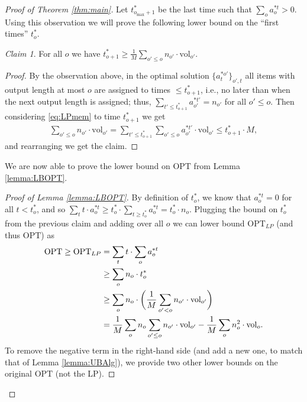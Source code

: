 \documentclass[11pt, a4paper]{article}
\theoremstyle{plain}
\theoremstyle{definition}
\theoremstyle{remark}
\newcommand{\OPT}{\text{OPT}}
\newtheorem{claim}[theorem]{Claim}
\newcommand{\vol}{\textrm{vol}}
\begin{document}
\begin{proof}[Proof of Theorem \ref{thm:main}]
Let $t^*_{o_{\max} + 1}$ be the last time such that $\sum_o a^{* t}_o > 0$. Using this observation we will prove the following lower bound on the ``first times'' $t^*_o$.



\begin{claim}	\label{claim:tStar}
	For all $o$ we have $t^*_{o + 1} \ge \frac{1}{M} \sum_{o' \le o} n_{o'} \cdot \vol_{o'}$. 
\end{claim}

\begin{proof}
	By the observation above, in the optimal solution $\{a^{*o'}_t\}_{o',t}$ all items with output length at most $o$ are assigned to times $\le t^*_{o + 1}$, i.e., no later than when the next output length is assigned; thus, $\sum_{t' \le t^*_{o + 1}} a^{*t'}_{o'} = n_{o'}$ for all $o' \le o$. Then considering \eqref{eq:LPmem} to time $t^*_{o + 1}$ we get
	\begin{align*}
		\sum_{o' \le o} n_{o'} \cdot \vol_{o'} = \sum_{t' \le t^*_{o + 1}} \sum_{o' \le o} a^{*t'}_{o'} \cdot \vol_{o'} \le t^*_{o + 1} \cdot M,
	\end{align*}
	and rearranging we get the claim. 
\end{proof}

We are now able to prove the lower bound on $\OPT$ from Lemma \ref{lemma:LBOPT}.

\begin{proof}[Proof of Lemma \ref{lemma:LBOPT}]
	By definition of $t^*_o$, we know that $a^{*t}_o = 0$ for all $t < t^*_o$, and so $\sum_t t \cdot a^{*t}_o \ge t^*_o \cdot \sum_{t \ge t^*_o} a^{*t}_o = t^*_o \cdot n_o$. Plugging the bound on $t^*_o$ from the previous claim and adding over all $o$ we can lower bound $\OPT_{LP}$ (and thus $\OPT$) as
	\begin{align}
	\OPT \ge \OPT_{LP} &= \sum_t t \cdot \sum_o a^{*t}_o \notag\\
	&\ge \sum_o n_o \cdot t^*_o \notag\\
	&\ge \sum_o n_o \cdot \bigg( \frac{1}{M} \sum_{o' < o} n_{o'} \cdot \vol_{o'} \bigg) \notag\\
	&=  \frac{1}{M} \sum_o n_o \sum_{o' \le o} n_{o'} \cdot \vol_{o'} - \frac{1}{M} \sum_o n_o^2 \cdot \vol_o.\label{eq:LBOPT1}
	\end{align}
	To remove the negative term in the right-hand side (and add a new one, to match that of Lemma \ref{lemma:UBAlg}), we provide two other lower bounds on the original $\OPT$ (not the LP). 
	

\end{proof}
\end{proof}
\end{document}
